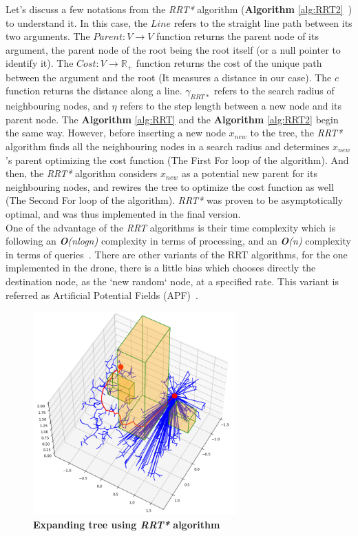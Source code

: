 \documentclass[letterpaper, 10 pt, conference]{ieeeconf}  %
\begin{document}
Let's discuss a few notations from the \textit{RRT*} algorithm (\textbf{Algorithm} \ref{alg:RRT2}~\cite{RRT}) to understand it. In this case, the $Line$ refers to the straight line path between its two arguments. The $Parent : V \rightarrow V$ function returns the parent node of its argument, the parent node of the root being the root itself (or a null pointer to identify it). The $Cost : V \rightarrow \mathbb{R_{+}}$ function returns the cost of the unique path between the argument and the root \cite{RRT} (It measures a distance in our case). The $c$ function returns the distance along a line. $\gamma_{RRT*}$ refers to the search radius of neighbouring nodes,  and $\eta$ refers to the step length between a new node and its parent node.
The \textbf{Algorithm} \ref{alg:RRT} and the \textbf{Algorithm} \ref{alg:RRT2} begin the same way. However, before inserting a new node $x_{new}$ to the tree, the \textit{RRT*} algorithm finds all the neighbouring nodes in a search radius and determines $x_{new}$'s parent optimizing the cost function (The First For loop of the algorithm). And then, the \textit{RRT*} algorithm considers $x_{new}$ as a potential new parent for its neighbouring nodes, and rewires the tree to optimize the cost function as well (The Second For loop of the algorithm). \textit{RRT*} was proven to be asymptotically optimal, and was thus implemented in the final version.\\

One of the advantage of the \textit{RRT} algorithms is their time complexity which is following an \textit{\textbf{O}}\textit{(nlogn)} complexity in terms of processing, and an \textit{\textbf{O}}\textit{(n)} complexity in terms of queries~\cite{RRT}. There are other variants of the RRT algorithms, for the one implemented in the drone, there is a little bias which chooses directly the destination node, as the `new random` node, at a specified rate. This variant is referred as Artificial Potential Fields (APF)~\cite{3D_RRT}.

\begin{figure}[h]
\centering
\includegraphics[width=7.8cm]{rrt_star.png}
\caption{ \textbf{Expanding tree using \textit{RRT*} algorithm}}
\label{fig:image2}
\end{figure}
\end{document}
